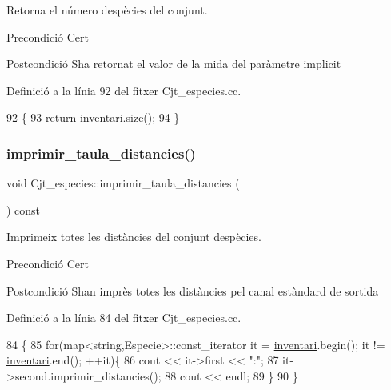 Retorna el número d\textquotesingle{}espècies del conjunt. 

\begin{DoxyPrecond}{Precondició}
Cert 
\end{DoxyPrecond}
\begin{DoxyPostcond}{Postcondició}
S\textquotesingle{}ha retornat el valor de la mida del paràmetre implicit 
\end{DoxyPostcond}


Definició a la línia 92 del fitxer Cjt\+\_\+especies.\+cc.


\begin{DoxyCode}
92                                       \{
93     \textcolor{keywordflow}{return} \hyperlink{class_cjt__especies_aa253bc335c8c8176b8ece5c49a15c5f3}{inventari}.size();
94 \}
\end{DoxyCode}
\mbox{\label{class_cjt__especies_aeb2402fbb6b5cc5eeea31981c51110bc}} 
\subsubsection{\texorpdfstring{imprimir\+\_\+taula\+\_\+distancies()}{imprimir\_taula\_distancies()}}
{\footnotesize\ttfamily void Cjt\+\_\+especies\+::imprimir\+\_\+taula\+\_\+distancies (\begin{DoxyParamCaption}{ }\end{DoxyParamCaption}) const}



Imprimeix totes les distàncies del conjunt d\textquotesingle{}espècies. 

\begin{DoxyPrecond}{Precondició}
Cert 
\end{DoxyPrecond}
\begin{DoxyPostcond}{Postcondició}
S\textquotesingle{}han imprès totes les distàncies pel canal estàndard de sortida 
\end{DoxyPostcond}


Definició a la línia 84 del fitxer Cjt\+\_\+especies.\+cc.


\begin{DoxyCode}
84                                                   \{
85     \textcolor{keywordflow}{for}(map<string,Especie>::const\_iterator it = \hyperlink{class_cjt__especies_aa253bc335c8c8176b8ece5c49a15c5f3}{inventari}.begin(); it != 
      \hyperlink{class_cjt__especies_aa253bc335c8c8176b8ece5c49a15c5f3}{inventari}.end(); ++it)\{
86         cout << it->first << \textcolor{stringliteral}{":"};
87         it->second.imprimir\_distancies();
88         cout << endl;
89     \}
90 \}
\end{DoxyCode}
\mbox{\label{class_cjt__especies_a8bc985ceafb3bb0e5f3c68ba52a36e86}} 

